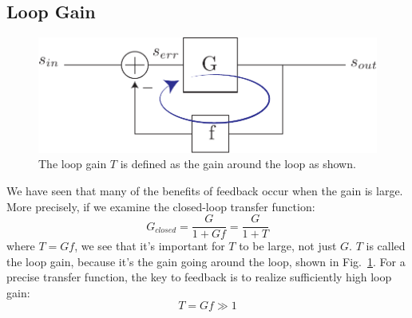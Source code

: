 \subsection{Loop Gain}
\begin{figure}[tb]
\centering
\includegraphics[scale=.7]{fbblock_loopgain}
\caption{The loop gain $T$ is defined as the gain around the loop as shown.}
\label{fig:fbblock_loopgain}
\end{figure}
We have seen that many of the benefits of feedback occur when the gain is large.  More precisely, if we examine the closed-loop transfer function:
    \begin{equation}
        {G_{closed}} = \frac{G}{{1 + Gf}} = \frac{G}{{1 + T}}
    \end{equation}
where $T = Gf$, we see that it's important for $T$ to be large, not just $G$.  $T$ is called the loop gain, because it's the gain going around the loop, shown in Fig.~\ref{fig:fbblock_loopgain}.  For a precise transfer function, the key to feedback is to realize sufficiently high loop gain:
    \begin{equation}
        T = Gf \gg 1
    \end{equation}
